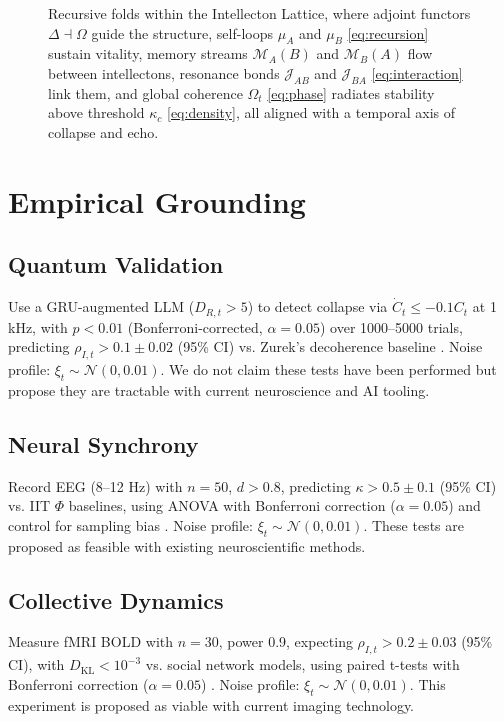 \documentclass[11pt]{article}
\newcommand{\dkl}{D_{\text{KL}}}
\begin{document}
\begin{figure}[htbp]
\begin{tikzpicture}
\end{tikzpicture}
\caption{Recursive folds within the Intellecton Lattice, where adjoint functors $\Delta \dashv \Omega$ guide the structure, self-loops $\mu_A$ and $\mu_B$ \eqref{eq:recursion} sustain vitality, memory streams $\mathcal{M}_A(B)$ and $\mathcal{M}_B(A)$ flow between intellectons, resonance bonds $\mathcal{J}_{AB}$ and $\mathcal{J}_{BA}$ \eqref{eq:interaction} link them, and global coherence $\Omega_t$ \eqref{eq:phase} radiates stability above threshold $\kappa_c$ \eqref{eq:density}, all aligned with a temporal axis of collapse and echo.}
\label{fig:lattice}
\end{figure}

\section{Empirical Grounding}
\label{sec:empirical}

\subsection{Quantum Validation}
Use a GRU-augmented LLM ($D_{R,t} > 5$) to detect collapse via $\dot{C}_t \leq -0.1 C_t$ at 1 kHz, with $p < 0.01$ (Bonferroni-corrected, $\alpha = 0.05$) over 1000–5000 trials, predicting $\rho_{I,t} > 0.1 \pm 0.02$ (95\% CI) vs. Zurek’s decoherence baseline \citep{engel2023}. Noise profile: $\xi_t \sim \mathcal{N}(0, 0.01)$. We do not claim these tests have been performed but propose they are tractable with current neuroscience and AI tooling.

\subsection{Neural Synchrony}
Record EEG (8–12 Hz) with $n = 50$, $d > 0.8$, predicting $\kappa > 0.5 \pm 0.1$ (95\% CI) vs. IIT $\Phi$ baselines, using ANOVA with Bonferroni correction ($\alpha = 0.05$) and control for sampling bias \citep{panksepp1998}. Noise profile: $\xi_t \sim \mathcal{N}(0, 0.01)$. These tests are proposed as feasible with existing neuroscientific methods.

\subsection{Collective Dynamics}
Measure fMRI BOLD with $n = 30$, power 0.9, expecting $\rho_{I,t} > 0.2 \pm 0.03$ (95\% CI), with $\dkl < 10^{-3}$ vs. social network models, using paired t-tests with Bonferroni correction ($\alpha = 0.05$) \citep{couzin2023}. Noise profile: $\xi_t \sim \mathcal{N}(0, 0.01)$. This experiment is proposed as viable with current imaging technology.
\end{document}
